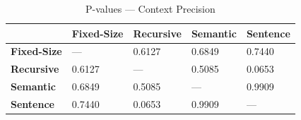 \begin{table}
\caption{P-values — Context Precision}
\label{tab:pvalues_context_precision}
\begin{tabular}{lllll}
\toprule
 & Fixed-Size & Recursive & Semantic & Sentence \\
\midrule
\textbf{Fixed-Size} & — & 0.6127 & 0.6849 & 0.7440 \\
\textbf{Recursive} & 0.6127 & — & 0.5085 & 0.0653 \\
\textbf{Semantic} & 0.6849 & 0.5085 & — & 0.9909 \\
\textbf{Sentence} & 0.7440 & 0.0653 & 0.9909 & — \\
\bottomrule
\end{tabular}
\end{table}
